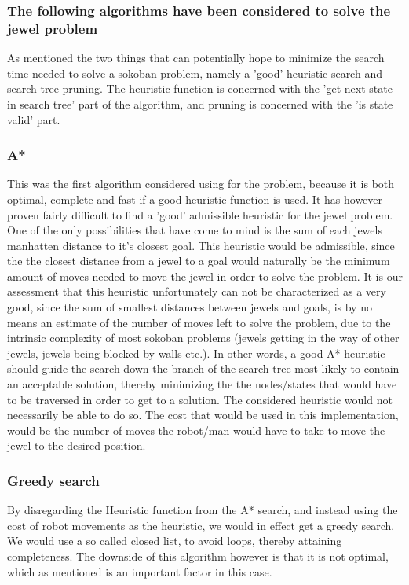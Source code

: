 \subsubsection*{The following algorithms have been considered to solve the jewel problem}
As mentioned the two things that can potentially hope to minimize the search time needed to solve a sokoban problem, namely a 'good' heuristic search and search tree pruning. The heuristic function is concerned with the 'get next state in search tree' part of the algorithm, and pruning is concerned with the 'is state valid' part.

\subsubsection*{A*}
This was the first algorithm considered using for the problem, because it is both optimal, complete and fast if a good heuristic function is used.
It has however proven fairly difficult to find a 'good' admissible heuristic for the jewel problem. One of the only possibilities that have come to mind is the sum of each jewels manhatten distance to it's closest goal. This heuristic would be admissible, since the the closest distance from a jewel to a goal would naturally be the minimum amount of moves needed to move the jewel in order to solve the problem. It is our assessment that this heuristic unfortunately can not be characterized as a very good, since the sum of smallest distances between jewels and goals, is by no means an estimate of the number of moves left to solve the problem, due to the intrinsic complexity of most sokoban problems (jewels getting in the way of other jewels, jewels being blocked by walls etc.). In other words, a good A* heuristic should guide the search down the branch of the search tree most likely to contain an acceptable solution, thereby minimizing the the nodes/states that would have to be traversed in order to get to a solution. The considered heuristic would not necessarily be able to do so.
The cost that would be used in this implementation, would be the number of moves the robot/man would have to take to move the jewel to the desired position.

\subsubsection*{Greedy search}
By disregarding the Heuristic function from the A* search, and instead using the cost of robot movements as the heuristic, we would in effect get a greedy search. We would use a so called closed list, to avoid loops, thereby attaining completeness. The downside of this algorithm however is that it is not optimal, which as mentioned is an important factor in this case.

